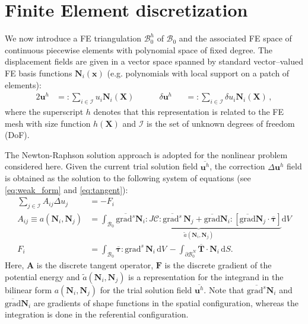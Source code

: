 \documentclass[times,doublespace]{nmeauth}
\newcommand*{\gz}[1]{\boldsymbol{#1}}
\newcommand*{\grad}{\mathrm{grad}}
\renewcommand*{\d}{\mathrm{d}}
\newcommand*{\mcl}[1]{\mathcal{#1}}
\begin{document}
\section{Finite Element discretization}
\label{sec:fe}

We now introduce a FE triangulation $\mathcal{B}^h_0$ of $\mcl B_0$ and
the associated FE space of continuous piecewise elements with polynomial space of fixed degree. %
The displacement fields are given in
a vector space spanned by standard vector--valued FE basis functions $\gz N_i(\gz x)$ (e.g. polynomials with local support on a patch of elements):
\begin{alignat}{2}
       \gz u^h &=:  \sum_{i \in \mcl I} u_i \gz N_i (\gz X) \quad \quad \quad
\delta \gz u^h &&=: \sum_{i \in \mcl I} \delta u_i \gz N_i (\gz X) \,,
\end{alignat}
where the superscript $h$ denotes that this representation is related to the FE mesh with size function $h(\gz X)$ and $\mcl I$ is the set of unknown degrees of freedom (DoF).

The Newton-Raphson solution approach is adopted for the nonlinear problem considered here.
Given the current trial solution field $\overline{\gz u^h}$, the correction $\Delta \gz u^h$ field is obtained as the solution to the following system of equations (see \eqref{eq:weak_form} and \eqref{eq:tangent}):
\begin{align}
  \sum_{j \in \mcl I} A_{ij} \Delta u_j &= - F_i  \label{eq:linear_system} \\
  A_{ij} \equiv a(\gz N_i, \gz N_j) &=
  \int_{\mcl B_0}
  \underbrace{
  \overline{\grad^s} \gz N_i : J \boldsymbol{\mathcal{C}} : \overline{\grad^s} \, \gz N_j
  +
  \overline{\grad}\gz N_i :
  \left[
  \overline{\grad} \gz N_j \cdot
  \overline{\gz \tau}
  \right]
  }_{\displaystyle \tilde{a}(\gz N_i, \gz N_j)}
  \d V
  \label{eq:algebraic_tangent}
  \\
  F_i &=
  \int_{\mcl B_0} \overline{\gz \tau} : \grad^{s} \, \gz N_i \, \d V \,
  -
  \int_{\partial \mcl B_0^N} \overline{\gz T} \cdot \gz N_i \, \d S.
\end{align}
Here, $\gz A$ is the discrete tangent operator, $\gz F$ is the discrete gradient of the potential energy
and $\tilde{a}(\gz N_i, \gz N_j)$ is a representation for the integrand in the bilinear form $a(\gz N_i, \gz N_j)$ for the trial solution field $\overline{\gz u^h}$.
Note that $\overline{\grad^s} \gz N_i$ and $\overline{\grad} \gz N_i$ are gradients of shape functions in the spatial configuration, whereas the integration is done in the referential configuration.
\end{document}
